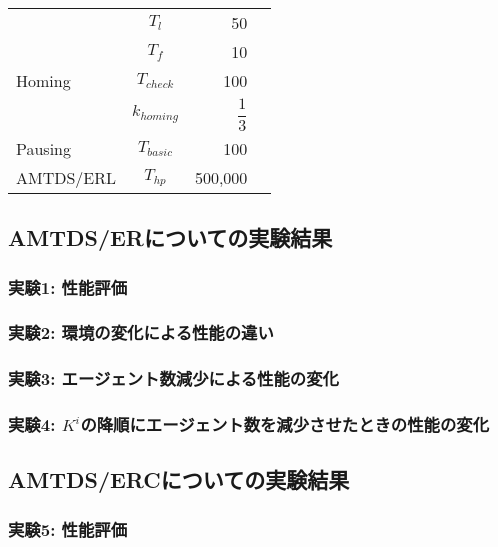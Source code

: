 \documentclass[12pt,a4j,twoside]{jarticle}
\begin{document}
\begin{table}
\begin{minipage}[t]{.55\textwidth}
\begin{tabular}{lcrr}
                       & $T_l$ & 50 \\
                       & $T_f$ & 10 \\ \hline
        Homing & $T_{check}$ & 100 \\
               & $k_{homing}$ & $\dfrac{1}{3}$ \\ \hline
        Pausing & $T_{basic}$ & 100 \\ \hline  
        AMTDS/ERL & $T_{hp}$ & 500,000 \\ \hline       
      \end{tabular}
      \label{tb:3}
    \end{minipage}
  \end{table}

  \subsection{AMTDS/ERについての実験結果}
  \label{result_ER}
  
  \subsubsection{実験1: 性能評価}
  \label{ex:ER1}
  
  \subsubsection{実験2: 環境の変化による性能の違い}
  \label{ex:ER2}

  \subsubsection{実験3: エージェント数減少による性能の変化}

  \subsubsection{実験4: $K^i$の降順にエージェント数を減少させたときの性能の変化}

  \subsection{AMTDS/ERCについての実験結果}
  \label{result_ERC}
  
  \subsubsection{実験5: 性能評価}
  \label{ex:ERC1}
  
\end{document}
